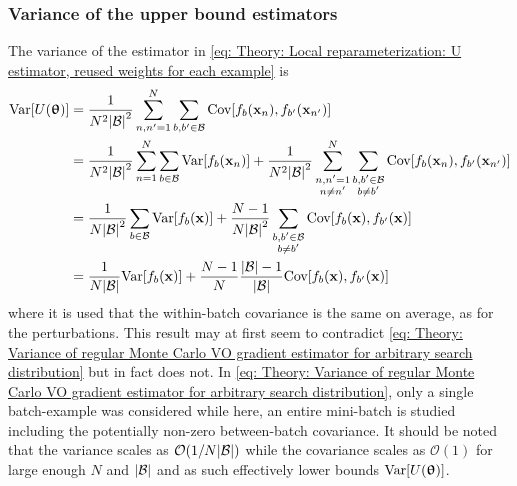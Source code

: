 \subsubsection{Variance of the upper bound estimators}
The variance of the estimator in \eqref{eq: Theory: Local reparameterization: U estimator, reused weights for each example} is
\begin{align}
    \text{Var}{\left[U({\boldsymbol{\uptheta}})\right]}
    &= \frac{1}{N^2{\left\lvert\mathcal{B}\right\rvert}^2}\sum_{n,n'=1}^N\sum_{b,b'\in\mathcal{B}}\text{Cov}{\left[f_b({\mathbf{x}}_n),f_{b'}({\mathbf{x}}_{n'})\right]}\nonumber\\
    &= \frac{1}{N^2{\left\lvert\mathcal{B}\right\rvert}^2}\sum_{n=1}^N\sum_{b\in\mathcal{B}}\text{Var}{\left[f_b({\mathbf{x}}_n)\right]} + \frac{1}{N^2{\left\lvert\mathcal{B}\right\rvert}^2}\sum_{\substack{n,n'=1\\n\ne n'}}^N\sum_{\substack{b,b'\in\mathcal{B}\\b\ne b'}}\text{Cov}{\left[f_b({\mathbf{x}}_n),f_{b'}({\mathbf{x}}_{n'})\right]}\nonumber\\
    &= \frac{1}{N{\left\lvert\mathcal{B}\right\rvert}^2}\sum_{b\in\mathcal{B}}\text{Var}{\left[f_b({\mathbf{x}})\right]} + \frac{N-1}{N{\left\lvert\mathcal{B}\right\rvert}^2}\sum_{\substack{b,b'\in\mathcal{B}\\b\ne b'}}\text{Cov}{\left[f_b({\mathbf{x}}),f_{b'}({\mathbf{x}})\right]}\nonumber\\
    &= \frac{1}{N{\left\lvert\mathcal{B}\right\rvert}}\text{Var}{\left[f_b({\mathbf{x}})\right]} + \frac{N-1}{N}\frac{{\left\lvert\mathcal{B}\right\rvert}-1}{{\left\lvert\mathcal{B}\right\rvert}}\text{Cov}{\left[f_b({\mathbf{x}}),f_{b'}({\mathbf{x}})\right]}
\end{align}
where it is used that the within-batch covariance is the same on average, as for the perturbations.
This result may at first seem to contradict \eqref{eq: Theory: Variance of regular Monte Carlo VO gradient estimator for arbitrary search distribution} but in fact does not. 
In \eqref{eq: Theory: Variance of regular Monte Carlo VO gradient estimator for arbitrary search distribution}, only a single batch-example was considered while here, an entire mini-batch is studied including the potentially non-zero between-batch covariance. It should be noted that the variance scales as $\mathcal{O}{\left(1/N{\left\lvert\mathcal{B}\right\rvert}\right)}$ while the covariance scales as $\mathcal{O}(1)$ for large enough $N$ and ${\left\lvert\mathcal{B}\right\rvert}$ and as such effectively lower bounds $\text{Var}{\left[U({\boldsymbol{\uptheta}})\right]}$.

